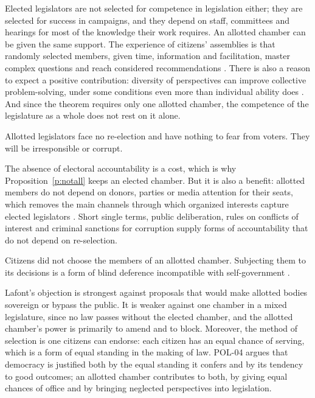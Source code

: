 \documentclass{situationist-preprint}
\begin{document}
\begin{reply}
Elected legislators are not selected for competence in legislation either; they are selected for success in campaigns, and they depend on staff, committees and hearings for most of the knowledge their work requires. An allotted chamber can be given the same support. The experience of citizens' assemblies is that randomly selected members, given time, information and facilitation, master complex questions and reach considered recommendations \citep{Fishkin2009}. There is also a reason to expect a positive contribution: diversity of perspectives can improve collective problem-solving, under some conditions even more than individual ability does \citep{HongPage2004,Landemore2013}. And since the theorem requires only one allotted chamber, the competence of the legislature as a whole does not rest on it alone.
\end{reply}

\begin{objection}[Accountability]
Allotted legislators face no re-election and have nothing to fear from voters. They will be irresponsible or corrupt.
\end{objection}

\begin{reply}
The absence of electoral accountability is a cost, which is why Proposition~\ref{p:notall} keeps an elected chamber. But it is also a benefit: allotted members do not depend on donors, parties or media attention for their seats, which removes the main channels through which organized interests capture elected legislators \citep{Guerrero2014}. Short single terms, public deliberation, rules on conflicts of interest and criminal sanctions for corruption supply forms of accountability that do not depend on re-selection.
\end{reply}

\begin{objection}[Consent]
Citizens did not choose the members of an allotted chamber. Subjecting them to its decisions is a form of blind deference incompatible with self-government \citep{Lafont2019}.
\end{objection}

\begin{reply}
Lafont's objection is strongest against proposals that would make allotted bodies sovereign or bypass the public. It is weaker against one chamber in a mixed legislature, since no law passes without the elected chamber, and the allotted chamber's power is primarily to amend and to block. Moreover, the method of selection is one citizens can endorse: each citizen has an equal chance of serving, which is a form of equal standing in the making of law. POL-04 argues that democracy is justified both by the equal standing it confers and by its tendency to good outcomes; an allotted chamber contributes to both, by giving equal chances of office and by bringing neglected perspectives into legislation.
\end{reply}
\end{document}
